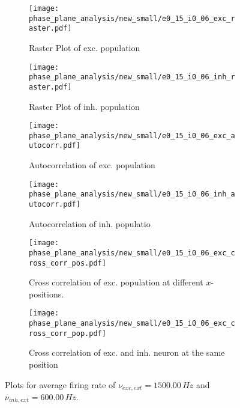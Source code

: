 \documentclass[a4paper,12pt]{article}
\begin{document}
\begin{figure}
    \begin{subfigure}[b]{0.49\textwidth}
        \texttt{[image: phase\_plane\_analysis/new\_small/e0\_15\_i0\_06\_exc\_raster.pdf]}
        \caption{Raster Plot of exc. population}
    \end{subfigure}
    \begin{subfigure}[b]{0.49\textwidth}
        \texttt{[image: phase\_plane\_analysis/new\_small/e0\_15\_i0\_06\_inh\_raster.pdf]}
        \caption{Raster Plot of inh. population}
    \end{subfigure}
    \begin{subfigure}[b]{0.49\textwidth}
        \texttt{[image: phase\_plane\_analysis/new\_small/e0\_15\_i0\_06\_exc\_autocorr.pdf]}
        \caption{Autocorrelation of exc. population}
    \end{subfigure}
    \begin{subfigure}[b]{0.49\textwidth}
        \texttt{[image: phase\_plane\_analysis/new\_small/e0\_15\_i0\_06\_inh\_autocorr.pdf]}
        \caption{Autocorrelation of inh. populatio}
    \end{subfigure}
    \begin{subfigure}[b]{0.49\textwidth}
        \texttt{[image: phase\_plane\_analysis/new\_small/e0\_15\_i0\_06\_exc\_cross\_corr\_pos.pdf]}
        \caption{Cross correlation of exc. population at different $x$-positions.}
    \end{subfigure}
    \begin{subfigure}[b]{0.49\textwidth}
        \texttt{[image: phase\_plane\_analysis/new\_small/e0\_15\_i0\_06\_exc\_cross\_corr\_pop.pdf]}
        \caption{Cross correlation of exc. and inh. neuron at the same position}
    \end{subfigure}
    \caption{Plots for average firing rate of 
                $\nu_{exc,ext} = 1500.00 \,\si{Hz}$ and $\nu_{inh,ext} = 600.00 \,\si{Hz}$.
                }
\end{figure}
    
\end{document}
